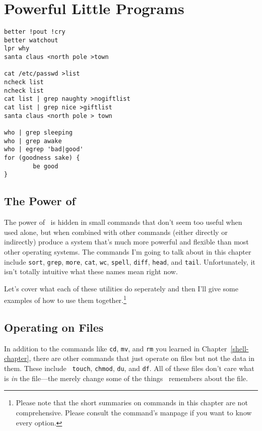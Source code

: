 \chapter{Powerful Little Programs}\label{commands-chapter}

\begin{screen}\begin{verbatim}
better !pout !cry
better watchout
lpr why
santa claus <north pole >town

cat /etc/passwd >list
ncheck list 
ncheck list
cat list | grep naughty >nogiftlist
cat list | grep nice >giftlist
santa claus <north pole > town

who | grep sleeping
who | grep awake
who | egrep 'bad|good'
for (goodness sake) {
        be good
}
\end{verbatim}\end{screen}


\section{The Power of \unix}

The power of \unix\ is hidden in small commands that don't seem too
useful when used alone, but when combined with other commands (either
directly or indirectly) produce a system that's much more powerful and
flexible than most other operating systems.  The commands I'm
going to talk about in this chapter include {\tt sort}, {\tt grep},
{\tt more}, {\tt cat}, {\tt wc}, {\tt spell}, {\tt diff}, {\tt head},
and {\tt tail}. Unfortunately, it isn't totally intuitive what these
names mean right now.  

Let's cover what each of these utilities do seperately and then I'll
give some examples of how to use them together.\footnote{Please note
  that the short summaries on commands in this chapter are not
  comprehensive. Please consult the command's manpage if you want to
  know every option.}

\section{Operating on Files}

In addition to the commands like {\tt cd}, {\tt mv}, and {\tt rm} you
learned in Chapter~\ref{shell-chapter}, there are other commands that
just operate on files but not the data in them. These include {\tt
  touch}, {\tt chmod}, {\tt du}, and {\tt df}. All of these files
don't care what is {\em in\/} the file---the merely change some of the
things \unix\ remembers about the file.

